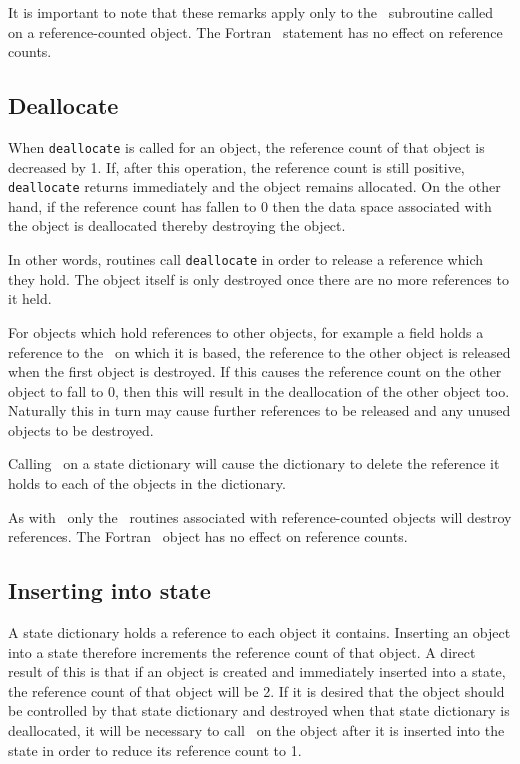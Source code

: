 \documentclass[a4paper, 11pt]{book}
\begin{document}
It is important to note that these remarks apply only to the \allocate\
subroutine called on a reference-counted object. The Fortran \allocate\
statement has no effect on reference counts.

\subsection{Deallocate}\label{sec:deallocate}

When \lstinline+deallocate+ is called for an object, the reference count of
that object is decreased by 1. If, after this operation, the reference count
is still positive, \lstinline+deallocate+ returns immediately and the object
remains allocated. On the other hand, if the reference count has fallen to 0
then the data space associated with the object is deallocated thereby
destroying the object.

In other words, routines call \lstinline+deallocate+ in order to release a
reference which they hold. The object itself is only destroyed once there
are no more references to it held. 

For objects which hold references to other objects, for example a field
holds a reference to the \meshtype\ on which it is based, the reference to
the other object is released when the first object is destroyed. If this
causes the reference count on the other object to fall to 0, then this will
result in the deallocation of the other object too. Naturally this in turn
may cause further references to be released and any unused objects to be
destroyed.

Calling \deallocate\ on a state dictionary will cause the dictionary to
delete the reference it holds to each of the objects in the dictionary.

As with \allocate\ only the \deallocate\ routines associated with
reference-counted objects will destroy references. The Fortran \deallocate\
object has no effect on reference counts.


\subsection{Inserting into state}\label{sec:refcount_state}

A state dictionary holds a reference to each object it contains. Inserting
an object into a state therefore increments the reference count of that
object. A direct result of this is that if an object is created and
immediately inserted into a state, the reference count of that object will
be 2. If it is desired that the object should be controlled by that state
dictionary and destroyed when that state dictionary is deallocated, it will
be necessary to call \deallocate\ on the object after it is inserted into
the state in order to reduce its reference count to 1.
\end{document}
